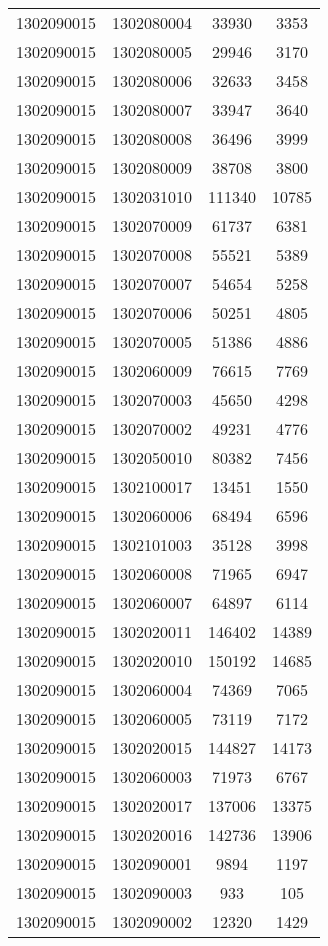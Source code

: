 \begin{longtable}{llcc}
1302090015 & 1302080004 & 33930 & 3353\\
1302090015 & 1302080005 & 29946 & 3170\\
1302090015 & 1302080006 & 32633 & 3458\\
1302090015 & 1302080007 & 33947 & 3640\\
1302090015 & 1302080008 & 36496 & 3999\\
1302090015 & 1302080009 & 38708 & 3800\\
1302090015 & 1302031010 & 111340 & 10785\\
1302090015 & 1302070009 & 61737 & 6381\\
1302090015 & 1302070008 & 55521 & 5389\\
1302090015 & 1302070007 & 54654 & 5258\\
1302090015 & 1302070006 & 50251 & 4805\\
1302090015 & 1302070005 & 51386 & 4886\\
1302090015 & 1302060009 & 76615 & 7769\\
1302090015 & 1302070003 & 45650 & 4298\\
1302090015 & 1302070002 & 49231 & 4776\\
1302090015 & 1302050010 & 80382 & 7456\\
1302090015 & 1302100017 & 13451 & 1550\\
1302090015 & 1302060006 & 68494 & 6596\\
1302090015 & 1302101003 & 35128 & 3998\\
1302090015 & 1302060008 & 71965 & 6947\\
1302090015 & 1302060007 & 64897 & 6114\\
1302090015 & 1302020011 & 146402 & 14389\\
1302090015 & 1302020010 & 150192 & 14685\\
1302090015 & 1302060004 & 74369 & 7065\\
1302090015 & 1302060005 & 73119 & 7172\\
1302090015 & 1302020015 & 144827 & 14173\\
1302090015 & 1302060003 & 71973 & 6767\\
1302090015 & 1302020017 & 137006 & 13375\\
1302090015 & 1302020016 & 142736 & 13906\\
1302090015 & 1302090001 & 9894 & 1197\\
1302090015 & 1302090003 & 933 & 105\\
1302090015 & 1302090002 & 12320 & 1429\\

\end{longtable}
